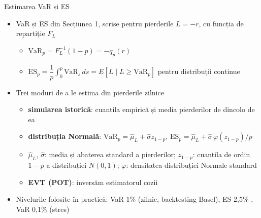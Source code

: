 \begin{frame}{Estimarea VaR și ES}
\itemsize{\small}
\begin{itemize}
    \item VaR și ES din Secțiunea 1, scrise pentru pierderile $L = -r$, cu funcția de repartiție $F_L$
    \begin{itemize}
        \item $\mathrm{VaR}_p = F_L^{-1}(1 - p) = -q_p(r)$
        \item $\mathrm{ES}_p = \dfrac{1}{p}\displaystyle\int_0^p \mathrm{VaR}_s\,ds = E[L \mid L \ge \mathrm{VaR}_p]$ pentru distribuții continue
    \end{itemize}
    \item Trei moduri de a le estima din pierderile zilnice
    \begin{itemize}
        \item \textbf{simularea istorică}: cuantila empirică și media pierderilor de dincolo de ea
        \item \textbf{distribuția Normală}: $\mathrm{VaR}_p = \hat\mu_L + \hat\sigma z_{1-p}$, $\mathrm{ES}_p = \hat\mu_L + \hat\sigma\,\varphi(z_{1-p})/p$
        \item $\hat\mu_L$, $\hat\sigma$: media și abaterea standard a pierderilor; $z_{1-p}$: cuantila de ordin $1-p$ a distribuției $N(0, 1)$; $\varphi$: densitatea distribuției Normale standard
        \item \textbf{EVT (POT)}: inversăm estimatorul cozii
    \end{itemize}
    \item Nivelurile folosite în practică: VaR 1\% (zilnic, backtesting Basel), ES 2,5\% , VaR 0,1\% (stres)
\end{itemize}
\end{frame}

